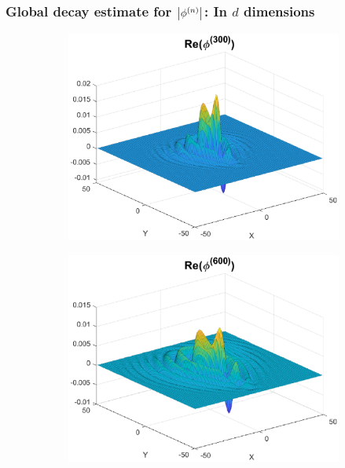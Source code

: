 \documentclass{beamer}
\theoremstyle{definition}
\begin{document}
\begin{frame}
\frametitle{Global decay estimate for $\abs{\phi^{(n)}}$: In $d$ dimensions}



\begin{figure}
	\begin{subfigure}{0.495\textwidth}
		\centering
		\includegraphics[width=\textwidth]{conv_ex0.eps}
	\end{subfigure}
	\begin{subfigure}{0.495\textwidth}
		\centering
		\includegraphics[width=\textwidth]{conv_ex1.eps}
	\end{subfigure}
\end{figure}

\end{frame}
\end{document}
